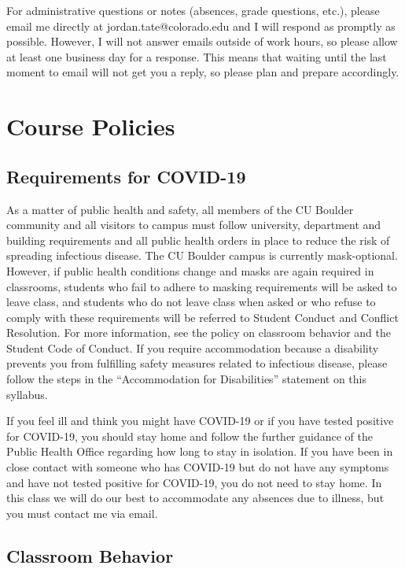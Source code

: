 For administrative questions or notes (absences, grade questions, etc.), please email me directly at jordan.tate@colorado.edu and I will respond as promptly as possible. However, I will not answer emails outside of work hours, so please allow at least one business day for a response. This means that waiting until the last moment to email will not get you a reply, so please plan and prepare accordingly.

\section{Course Policies}

\subsection{Requirements for COVID-19}

As a matter of public health and safety, all members of the CU Boulder community and all visitors to campus must follow university, department and building requirements and all public health orders in place to reduce the risk of spreading infectious disease. The CU Boulder campus is currently mask-optional. However, if public health conditions change and masks are again required in classrooms, students who fail to adhere to masking requirements will be asked to leave class, and students who do not leave class when asked or who refuse to comply with these requirements will be referred to Student Conduct and Conflict Resolution. For more information, see the policy on classroom behavior and the Student Code of Conduct. If you require accommodation because a disability prevents you from fulfilling safety measures related to infectious disease, please follow the steps in the “Accommodation for Disabilities” statement on this syllabus.

If you feel ill and think you might have COVID-19 or if you have tested positive for COVID-19, you should stay home and follow the further guidance of the Public Health Office regarding how long to stay in isolation. If you have been in close contact with someone who has COVID-19 but do not have any symptoms and have not tested positive for COVID-19, you do not need to stay home. In this class we will do our best to accommodate any absences due to illness, but you must contact me via email.

\subsection{Classroom Behavior}

